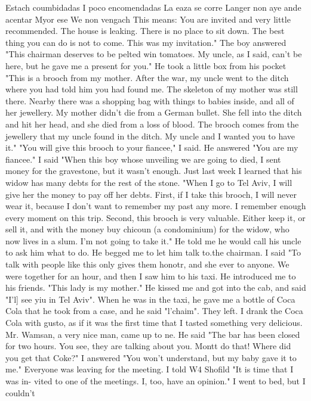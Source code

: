 Estach coumbidadas 
I poco encomendadas 
La eaza se corre 
Langer non aye ande acentar 
Myor ese We non vengach 
This means: You are invited and very little recommended. The house is leaking. There 
is no place to sit down. The best thing you can do is not to come. This was my invitation." 
The boy answered "This chairman deserves to be pelted win tomatoes. My uncle, as I 
said, can't be here, but he gave me a present for you." He took a little box from his pocket 
"This is a brooch from my mother. After the war, my uncle went to the ditch where you had 
told him you had found me. The skeleton of my mother was still there. Nearby there was 
a shopping bag with things to babies inside, and all of her jewellery. My mother 
didn't die from a German bullet. She fell into the ditch and hit her head, and she died from a loss of blood. The brooch comes from the jewellery that my uncle found in the ditch. 
My uncle and I wanted you to have it." 
"You will give this brooch to your fiancee," I said. He answered "You are my fiancee." 
I said "When this boy whose unveiling we are going to died, I sent money for the gravestone, but it wasn't enough. Just last week I learned that his widow has many debts for the rest of the stone. "When I go to Tel Aviv, I will give her the money to pay off her debts. 
First, if I take this brooch, I will never wear it, because I don't want to remember my 
past any more. I remember enough every moment on this trip. Second, this brooch is very 
valuable. Either keep it, or sell it, and with the money buy chicoun (a condominium) for 
the widow, who now lives in a slum. I'm not going to take it." 
He told me he would call his uncle to ask him what to do. He begged me to let him talk 
to.the chairman. I said "To talk with people like this only gives them honotr, and she 
ever to anyone. 
We were together for an hour, and then I saw him to his taxi. He introduced me to 
his friends. "This lady is my mother." He kissed me and got into the cab, and said "I'l] 
see yiu in Tel Aviv". When he was in the taxi, he gave me a bottle of Coca Cola that he 
took from a case, and he said "l'chaim". They left. I drank the Coca Cola with gusto, as 
if it was the first time that I tasted something very delicious. Mr. Wamsan, a very nice 
man, came up to ne. He said "The bar has been closed for two hours. You see, they are 
talking about you. Montt do that! Where did you get that Coke?" I answered "You won't 
understand, but my baby gave it to me." 
Everyone was leaving for the meeting. I told W4 Shofild "It is time that I was in-
vited to one of the meetings. I, too, have an opinion." I went to bed, but I couldn't 
